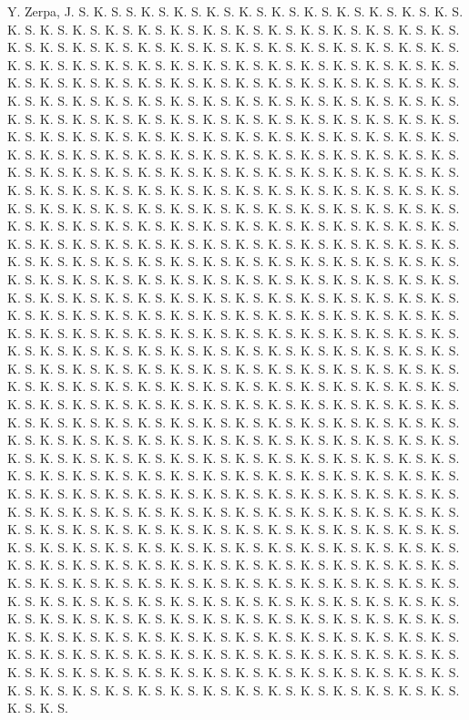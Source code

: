 \documentclass[12pt, a4paper]{report}
\begin{document}
\begin{thebibliography}{99}
     Y. Zerpa, J. S. K. S. S. K. S. K. S. K. S. K. S. K. S. K. S. K. S. K. S. K. S. K. S. K. S. K. S. K. S. K. S. K. S. K. S. K. S. K. S. K. S. K. S. K. S. K. S. K. S. K. S. K. S. K. S. K. S. K. S. K. S. K. S. K. S. K. S. K. S. K. S. K. S. K. S. K. S. K. S. K. S. K. S. K. S. K. S. K. S. K. S. K. S. K. S. K. S. K. S. K. S. K. S. K. S. K. S. K. S. K. S. K. S. K. S. K. S. K. S. K. S. K. S. K. S. K. S. K. S. K. S. K. S. K. S. K. S. K. S. K. S. K. S. K. S. K. S. K. S. K. S. K. S. K. S. K. S. K. S. K. S. K. S. K. S. K. S. K. S. K. S. K. S. K. S. K. S. K. S. K. S. K. S. K. S. K. S. K. S. K. S. K. S. K. S. K. S. K. S. K. S. K. S. K. S. K. S. K. S. K. S. K. S. K. S. K. S. K. S. K. S. K. S. K. S. K. S. K. S. K. S. K. S. K. S. K. S. K. S. K. S. K. S. K. S. K. S. K. S. K. S. K. S. K. S. K. S. K. S. K. S. K. S. K. S. K. S. K. S. K. S. K. S. K. S. K. S. K. S. K. S. K. S. K. S. K. S. K. S. K. S. K. S. K. S. K. S. K. S. K. S. K. S. K. S. K. S. K. S. K. S. K. S. K. S. K. S. K. S. K. S. K. S. K. S. K. S. K. S. K. S. K. S. K. S. K. S. K. S. K. S. K. S. K. S. K. S. K. S. K. S. K. S. K. S. K. S. K. S. K. S. K. S. K. S. K. S. K. S. K. S. K. S. K. S. K. S. K. S. K. S. K. S. K. S. K. S. K. S. K. S. K. S. K. S. K. S. K. S. K. S. K. S. K. S. K. S. K. S. K. S. K. S. K. S. K. S. K. S. K. S. K. S. K. S. K. S. K. S. K. S. K. S. K. S. K. S. K. S. K. S. K. S. K. S. K. S. K. S. K. S. K. S. K. S. K. S. K. S. K. S. K. S. K. S. K. S. K. S. K. S. K. S. K. S. K. S. K. S. K. S. K. S. K. S. K. S. K. S. K. S. K. S. K. S. K. S. K. S. K. S. K. S. K. S. K. S. K. S. K. S. K. S. K. S. K. S. K. S. K. S. K. S. K. S. K. S. K. S. K. S. K. S. K. S. K. S. K. S. K. S. K. S. K. S. K. S. K. S. K. S. K. S. K. S. K. S. K. S. K. S. K. S. K. S. K. S. K. S. K. S. K. S. K. S. K. S. K. S. K. S. K. S. K. S. K. S. K. S. K. S. K. S. K. S. K. S. K. S. K. S. K. S. K. S. K. S. K. S. K. S. K. S. K. S. K. S. K. S. K. S. K. S. K. S. K. S. K. S. K. S. K. S. K. S. K. S. K. S. K. S. K. S. K. S. K. S. K. S. K. S. K. S. K. S. K. S. K. S. K. S. K. S. K. S. K. S. K. S. K. S. K. S. K. S. K. S. K. S. K. S. K. S. K. S. K. S. K. S. K. S. K. S. K. S. K. S. K. S. K. S. K. S. K. S. K. S. K. S. K. S. K. S. K. S. K. S. K. S. K. S. K. S. K. S. K. S. K. S. K. S. K. S. K. S. K. S. K. S. K. S. K. S. K. S. K. S. K. S. K. S. K. S. K. S. K. S. K. S. K. S. K. S. K. S. K. S. K. S. K. S. K. S. K. S. K. S. K. S. K. S. K. S. K. S. K. S. K. S. K. S. K. S. K. S. K. S. K. S. K. S. K. S. K. S. K. S. K. S. K. S. K. S. K. S. K. S. K. S. K. S. K. S. K. S. K. S. K. S. K. S. K. S. K. S. K. S. K. S. K. S. K. S. K. S. K. S. K. S. K. S. K. S. K. S. K. S. K. S. K. S. K. S. K. S. K. S. K. S. K. S. K. S. K. S. K. S. K. S. K. S. K. S. K. S. K. S. K. S. K. S. K. S. K. S. K. S. K. S. K. S. K. S. K. S. K. S. K. S. K. S. K. S. K. S. K. S. K. S. K. S. K. S. K. S. K. S. K. S. K. S. K. S. K. S. K. S. K. S. K. S. K. S. K. S. K. S. K. S. K. S. K. S. K. S. K. S. K. S. K. S. K. S. K. S. K. S. K. S. K. S. K. S. K. S. K. S. K. S. K. S. K. S. K. S. K. S. K. S. K. S. K. S. K. S. K. S. K. S. K. S. K. S. K. S. K. S. K. S. K. S. K. S. K. S. K. S. K. S. K. S. K. S. K. S. K. S. K. S. K. S. K. S. K. S. K. S. K. S. K. S. K. S. K. S. K. S. K. S. K. S. K. S. K. S. K. S. K. S. K. S. K. S. K. S. K. S. K. S. K. S. K. S. K. S. K. S. K. S. K. S. K. S. K. S. K. S. K. S. K. S. 
\end{thebibliography}
\end{document}
